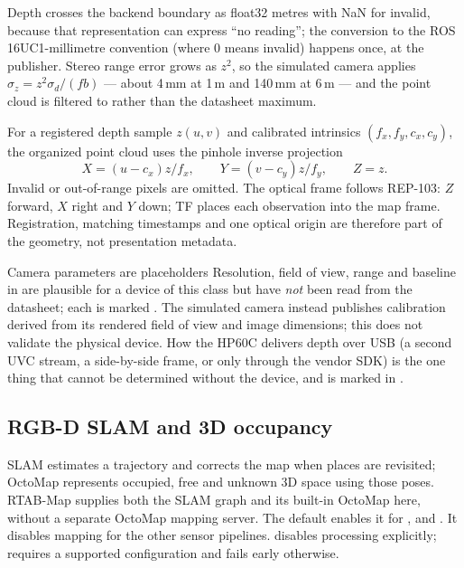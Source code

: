 \documentclass[11pt,a4paper]{article}
\begin{document}
Depth crosses the backend boundary as float32 metres with NaN for invalid,
because that representation can express ``no reading''; the conversion to the
ROS 16UC1-millimetre convention (where 0 means invalid) happens once, at the
publisher. Stereo range error grows as $z^2$, so the simulated camera applies
$\sigma_z = z^2 \sigma_d / (f b)$ --- about 4\,mm at 1\,m and 140\,mm at 6\,m ---
and the point cloud is filtered to  rather than the
datasheet maximum.

For a registered depth sample $z(u,v)$ and calibrated intrinsics
$(f_x,f_y,c_x,c_y)$, the organized point cloud uses the pinhole inverse
projection
\[
  X=(u-c_x)z/f_x,\qquad Y=(v-c_y)z/f_y,\qquad Z=z.
\]
Invalid or out-of-range pixels are omitted. The optical frame follows REP-103:
$Z$ forward, $X$ right and $Y$ down; TF places each observation into the map
frame. Registration, matching timestamps and one optical origin are therefore
part of the geometry, not presentation metadata.

\begin{caveat}{Camera parameters are placeholders}
Resolution, field of view, range and baseline in
 are plausible for a device of this class but have
\emph{not} been read from the datasheet; each is marked \code{[VERIFY]}. The
simulated camera instead publishes calibration derived from its rendered field
of view and image dimensions; this does not validate the physical device.
How the HP60C delivers depth over USB (a second UVC
stream, a side-by-side frame, or only through the vendor SDK) is the one thing
that cannot be determined without the device, and is marked  in
.
\end{caveat}

\subsection{RGB-D SLAM and 3D occupancy}
\label{sec:mapping}

SLAM estimates a trajectory and corrects the map when places are revisited;
OctoMap represents occupied, free and unknown 3D space using those poses.
RTAB-Map supplies both the SLAM graph and its built-in OctoMap here, without a
separate OctoMap mapping server. The default  enables it
for ,  and
. It disables mapping for the other sensor pipelines.
 disables processing explicitly; 
requires a supported configuration and fails early otherwise.
\end{document}
